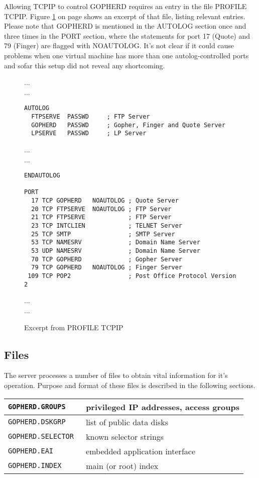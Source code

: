   Allowing TCPIP to control GOPHERD requires an entry in the file
  PROFILE TCPIP.  Figure \ref{PROFILE.TCPIP} on page \pageref{PROFILE.TCPIP}
  shows an excerpt of that file, listing relevant entries.
  Please note that GOPHERD is mentioned in the AUTOLOG section once and
  three times in the PORT section, where the statements for port
  17 (Quote) and 79 (Finger) are flagged with NOAUTOLOG.  It's not
  clear if it could cause problems when one virtual machine
  has more than one autolog-controlled ports and sofar this setup
  did not reveal any shortcoming.

\begin{figure}\label{PROFILE.TCPIP}
\caption{Excerpt from PROFILE TCPIP}
...\\
...
\begin{verbatim}
AUTOLOG
  FTPSERVE  PASSWD     ; FTP Server
  GOPHERD   PASSWD     ; Gopher, Finger and Quote Server
  LPSERVE   PASSWD     ; LP Server
\end{verbatim}
...\\
...
\begin{verbatim}
ENDAUTOLOG

PORT
  17 TCP GOPHERD   NOAUTOLOG ; Quote Server
  20 TCP FTPSERVE  NOAUTOLOG ; FTP Server
  21 TCP FTPSERVE            ; FTP Server
  23 TCP INTCLIEN            ; TELNET Server
  25 TCP SMTP                ; SMTP Server
  53 TCP NAMESRV             ; Domain Name Server
  53 UDP NAMESRV             ; Domain Name Server
  70 TCP GOPHERD             ; Gopher Server
  79 TCP GOPHERD   NOAUTOLOG ; Finger Server
 109 TCP POP2                ; Post Office Protocol Version 2
\end{verbatim}
...\\
...
\end{figure}



\subsection{Files}


The server processes a number of files to obtain vital information
for it's operation.  Purpose and format of these files is described
in the following sections.

\begin{tabular}{|l|l|} \hline
\tt GOPHERD.GROUPS    & privileged IP addresses, access groups \\ \hline
\tt GOPHERD.DSKGRP    & list of public data disks \\ \hline
\tt GOPHERD.SELECTOR  & known selector strings \\ \hline
\tt GOPHERD.EAI       & embedded application interface \\ \hline
\tt GOPHERD.INDEX     & main (or root) index \\ \hline
\end{tabular}



